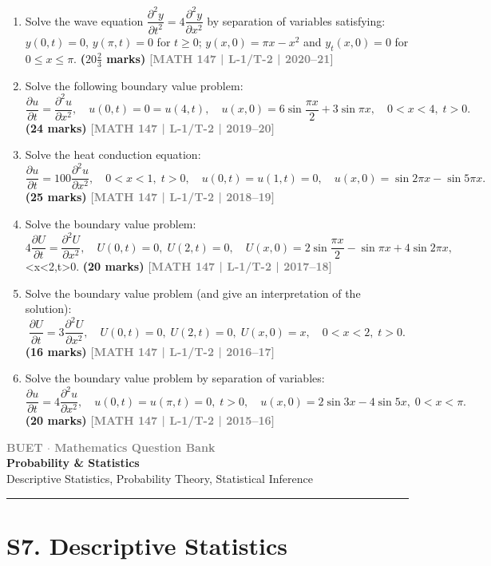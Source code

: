 \documentclass[12pt,a4paper]{article}
\newcommand{\yr}[1]{\hfill\textcolor{gray}{\small\textbf{[#1]}}}
\newcommand{\mk}[1]{\textcolor{orange!70!black}{\small\textbf{(#1 marks)}}}
\newcommand{\secdivider}[3]{%
  \newpage\thispagestyle{empty}%
  \vspace*{\fill}%
  \begin{tcolorbox}[enhanced,colback=#3!6,colframe=#3,boxrule=1.5pt,arc=8pt,
    left=20pt,right=20pt,top=22pt,bottom=22pt,
    shadow={3pt}{-3pt}{0pt}{black!15}]
    \centering
    {\large\textcolor{gray}{\textbf{BUET $\cdot$ Mathematics Question Bank}}}\\[8pt]
    {\fontsize{26}{32}\selectfont\bfseries\textcolor{#3}{#1}}\\[6pt]
    {\fontsize{15}{19}\selectfont\textcolor{dgray}{#2}}\\[12pt]
    \textcolor{#3!60}{\rule{0.5\textwidth}{0.5pt}}
  \end{tcolorbox}%
  \vspace*{\fill}\newpage%
}
\begin{document}
\begin{enumerate}
\item Solve the wave equation $\dfrac{\partial^{2}y}{\partial t^{2}}=4\dfrac{\partial^{2}y}{\partial x^{2}}$ by separation of variables satisfying: $y(0,t)=0$, $y(\pi,t)=0$ for $t\ge 0$; $y(x,0)=\pi x-x^{2}$ and $y_{t}(x,0)=0$ for $0\le x\le\pi$.
\mk{$20\tfrac{2}{3}$} \yr{MATH 147 | L-1/T-2 | 2020--21}

\item Solve the following boundary value problem:
\[
\frac{\partial u}{\partial t}=\frac{\partial^{2}u}{\partial x^{2}},\quad u(0,t)=0=u(4,t),\quad u(x,0)=6\sin\frac{\pi x}{2}+3\sin\pi x,\quad 0<x<4,\;t>0.
\]
\mk{24} \yr{MATH 147 | L-1/T-2 | 2019--20}

\item Solve the heat conduction equation:
\[
\frac{\partial u}{\partial t}=100\frac{\partial^{2}u}{\partial x^{2}},\quad 0<x<1,\;t>0,\quad u(0,t)=u(1,t)=0,\quad u(x,0)=\sin 2\pi x-\sin 5\pi x.
\]
\mk{25} \yr{MATH 147 | L-1/T-2 | 2018--19}

\item Solve the boundary value problem:
\[
4\frac{\partial U}{\partial t}=\frac{\partial^{2}U}{\partial x^{2}},\quad U(0,t)=0,\;U(2,t)=0,\quad U(x,0)=2\sin\frac{\pi x}{2}-\sin\pi x+4\sin 2\pi x,
\]
<x<2,\;t>0.
\mk{20} \yr{MATH 147 | L-1/T-2 | 2017--18}

\item Solve the boundary value problem (and give an interpretation of the solution):
\[
\frac{\partial U}{\partial t}=3\frac{\partial^{2}U}{\partial x^{2}},\quad U(0,t)=0,\;U(2,t)=0,\;U(x,0)=x,\quad 0<x<2,\;t>0.
\]
\mk{16} \yr{MATH 147 | L-1/T-2 | 2016--17}

\item Solve the boundary value problem by separation of variables:
\[
\frac{\partial u}{\partial t}=4\frac{\partial^{2}u}{\partial x^{2}},\quad u(0,t)=u(\pi,t)=0,\;t>0,\quad u(x,0)=2\sin 3x-4\sin 5x,\;0<x<\pi.
\]
\mk{20} \yr{MATH 147 | L-1/T-2 | 2015--16}

\end{enumerate}


\secdivider{Probability \& Statistics}{Descriptive Statistics, Probability Theory, Statistical Inference}{cG}

\section{S7. Descriptive Statistics}
\label{sec:S7}
\end{document}
